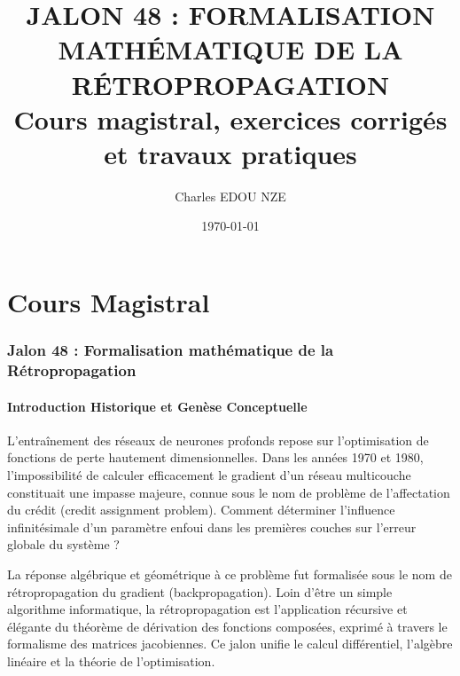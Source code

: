 \documentclass[11pt,a4paper]{article}
\title{\Huge JALON 48 : FORMALISATION MATHÉMATIQUE DE LA RÉTROPROPAGATION \\ \large Cours magistral, exercices corrigés et travaux pratiques}
\author{\Large Charles EDOU NZE}
\date{\today}
\begin{document}
\maketitle
\tableofcontents
\newpage

\part{Cours Magistral}
\section{Jalon 48 : Formalisation mathématique de la Rétropropagation}

\subsection{Introduction Historique et Genèse Conceptuelle}

L'entraînement des réseaux de neurones profonds repose sur l'optimisation de fonctions de perte hautement dimensionnelles. Dans les années 1970 et 1980, l'impossibilité de calculer efficacement le gradient d'un réseau multicouche constituait une impasse majeure, connue sous le nom de problème de l'affectation du crédit (credit assignment problem). Comment déterminer l'influence infinitésimale d'un paramètre enfoui dans les premières couches sur l'erreur globale du système ?

La réponse algébrique et géométrique à ce problème fut formalisée sous le nom de rétropropagation du gradient (backpropagation). Loin d'être un simple algorithme informatique, la rétropropagation est l'application récursive et élégante du théorème de dérivation des fonctions composées, exprimé à travers le formalisme des matrices jacobiennes. Ce jalon unifie le calcul différentiel, l'algèbre linéaire et la théorie de l'optimisation.

\end{document}
